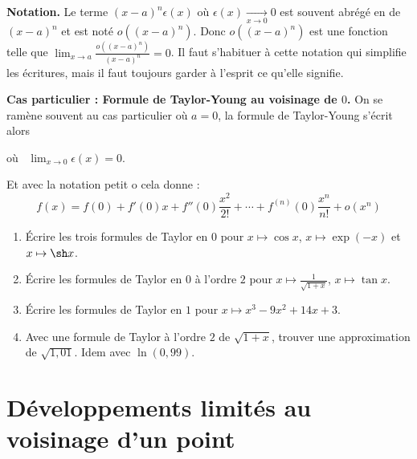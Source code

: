 \documentclass[class=report,crop=false]{standalone}
\begin{document}
\bigskip

\textbf{Notation.}
Le terme $(x-a)^n\epsilon(x)$ où $\epsilon(x) \xrightarrow[x\to 0]{} 0$
est souvent abrégé en \og {} \fg{} de $(x-a)^n$ et est noté $o((x-a)^n)$.
Donc $o((x-a)^n)$ est une fonction telle que $\lim_{x\to a}\frac{o((x-a)^n)}{(x-a)^n}=0$.
Il faut s'habituer à cette notation qui simplifie les écritures, mais il faut toujours garder à l'esprit
ce qu'elle signifie.

\bigskip

\textbf{Cas particulier : Formule de Taylor-Young au voisinage de $0$.}
On se ramène souvent au cas particulier où $a=0$, la formule de Taylor-Young s'écrit alors

où \ $\lim_{x\to0}\epsilon (x)=0$.

Et avec la notation \og petit o \fg{} cela donne :
$$f(x)= f(0)+f'(0)x+f''(0)\frac{x^2}{2!}+\cdots
+f^{(n)}(0)\frac{x^n}{n!} + o(x^n)$$



\begin{miniexercices}
\sauteligne
\begin{enumerate}
  \item Écrire les trois formules de Taylor en $0$ pour $x \mapsto \cos x$, $x\mapsto \exp(-x)$ et $x\mapsto \sh x$.
  \item Écrire les formules de Taylor en $0$ à l'ordre $2$ pour $x \mapsto \frac{1}{\sqrt{1+x}}$, $x\mapsto \tan x$.
  \item Écrire les formules de Taylor en $1$ pour $x \mapsto x^3-9x^2+14x+3$.
  \item Avec une formule de Taylor à l'ordre $2$ de $\sqrt{1+x}$, trouver une approximation
de $\sqrt{1,01}$. Idem avec $\ln(0,99)$.
\end{enumerate}
\end{miniexercices}

\section{Développements limités au voisinage d'un point}
\end{document}
